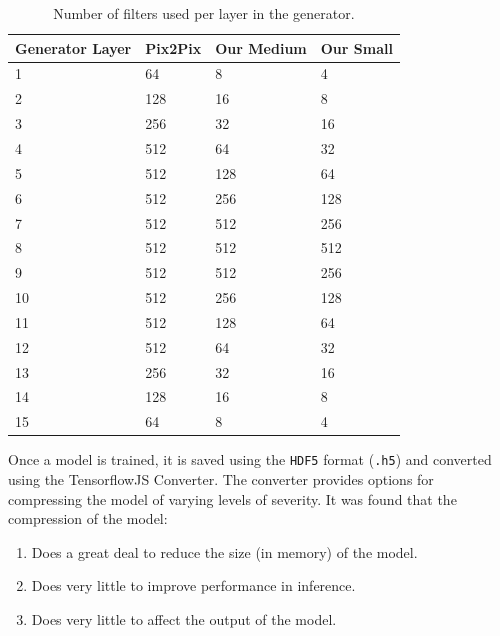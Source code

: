 \documentclass{article}
\begin{document}
\begin{small}
	\begin{table}
		\begin{center}
			\begin{tabular}{p{2cm}p{2cm}p{2cm}p{2cm}}
				\toprule
				Generator Layer & Pix2Pix & Our Medium & Our Small \\
				\midrule
				1               & 64      & 8          & 4         \\
				2               & 128     & 16         & 8         \\
				3               & 256     & 32         & 16        \\
				4               & 512     & 64         & 32        \\
				5               & 512     & 128        & 64        \\
				6               & 512     & 256        & 128       \\
				7               & 512     & 512        & 256       \\
				8               & 512     & 512        & 512       \\
				9               & 512     & 512        & 256       \\
				10              & 512     & 256        & 128       \\
				11              & 512     & 128        & 64        \\
				12              & 512     & 64         & 32        \\
				13              & 256     & 32         & 16        \\
				14              & 128     & 16         & 8         \\
				15              & 64      & 8          & 4         \\
				\bottomrule
			\end{tabular}
			\caption{Number of filters used per layer in the generator.\label{table:numFilters}}
		\end{center}
	\end{table}
\end{small}

Once a model is trained, it is saved using the \verb|HDF5| format (\verb|.h5|) and converted using the TensorflowJS Converter. The converter provides options for compressing the model of varying levels of severity. It was found that the compression of the model:

\begin{enumerate}
	\item Does a great deal to reduce the size (in memory) of the model.
	\item Does very little to improve performance in inference.
	\item Does very little to affect the output of the model.
\end{enumerate}
\end{document}
